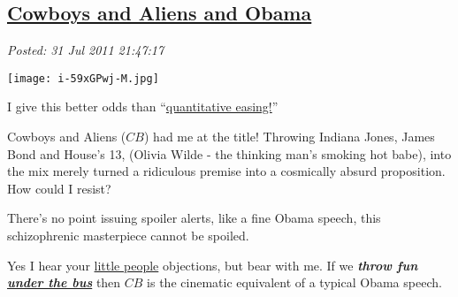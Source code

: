%

\subsection*{\href{http://bakerjd99.wordpress.com/2011/07/31/cowboys-and-aliens-and-obama/}{Cowboys and Aliens and Obama}}


\noindent\emph{Posted: 31 Jul 2011 21:47:17}
\vspace{6pt}


\captionsetup[floatingfigure]{labelformat=empty}
\begin{floatingfigure}[l]{0.30\textwidth}
\centering
\texttt{[image: i-59xGPwj-M.jpg]}
\caption{I give  this better odds than ``\href{http://www.youtube.com/watch?v=PTUY16CkS-k}{quantitative  easing!}''}
\label{fig:1698X0}
\end{floatingfigure}Cowboys and Aliens ($CB$) had me at the title! Throwing Indiana Jones, James
Bond and House's 13, (Olivia Wilde - the thinking man's smoking hot
babe), into the mix merely turned a ridiculous premise into a cosmically
absurd proposition. How could I resist?

There's no point issuing spoiler alerts, like a fine Obama speech, this
schizophrenic masterpiece cannot be spoiled.

Yes I hear your
\href{http://www.nationalreview.com/corner/267605/safe-sex-and-taxes-are-little-people-victor-davis-hanson}{little
people} objections, but bear with me. If we \emph{\textbf{throw fun
\href{http://www.post-gazette.com/pg/08184/894024-51.stm}{under the
bus}}} then $CB$ is the cinematic equivalent of a typical Obama speech.


